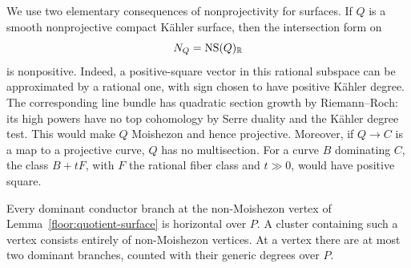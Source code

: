 We use two elementary consequences of nonprojectivity for surfaces.
If $Q$ is a smooth nonprojective compact K\"ahler surface, then the
intersection form on
\[
 N_Q=\operatorname{NS}(Q)_{\mathbb{R}}
\]
is nonpositive.  Indeed, a positive-square vector in this rational
subspace can be approximated by a rational one, with sign chosen to
have positive K\"ahler degree.  The corresponding line bundle has
quadratic section growth by Riemann--Roch: its high powers have no
top cohomology by Serre duality and the K\"ahler degree test.  This
would make $Q$ Moishezon and hence projective.  Moreover, if
$Q\to C$ is a map to a projective curve, $Q$ has no multisection.
For a curve $B$ dominating $C$, the class $B+tF$, with $F$ the
rational fiber class and $t\gg0$, would have positive square.

\begin{lemma}
\label{floor:horizontality}
Every dominant conductor branch at the non-Moishezon vertex of
Lemma~\ref{floor:quotient-surface} is horizontal over $P$.  A
cluster containing such a vertex consists entirely of
non-Moishezon vertices.  At a vertex there are at most two dominant
branches, counted with their generic degrees over $P$.
\end{lemma}

